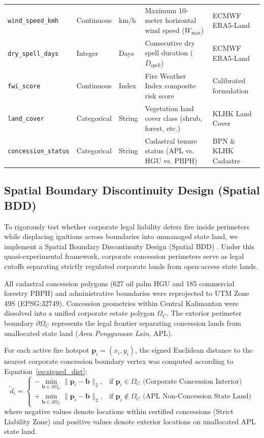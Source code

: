 \begin{table}[htbp]
\begin{tabularx}{\textwidth}{lllLP{3.0cm}}
\texttt{wind\_speed\_kmh} & Continuous & km/h & Maximum 10-meter horizontal wind speed ($W_{\text{max}}$) & ECMWF ERA5-Land \\
\texttt{dry\_spell\_days} & Integer & Days & Consecutive dry spell duration ($D_{\text{spell}}$) & ECMWF ERA5-Land \\
\texttt{fwi\_score} & Continuous & Index & Fire Weather Index composite risk score & Calibrated formulation \\
\texttt{land\_cover} & Categorical & String & Vegetation land cover class (shrub, forest, etc.) & KLHK Land Cover \\
\texttt{concession\_status} & Categorical & String & Cadastral tenure status (APL vs. HGU vs. PBPH) & BPN \& KLHK Cadastre \\
\bottomrule
\end{tabularx}
\end{table}

\subsection{Spatial Boundary Discontinuity Design (Spatial BDD)}
\label{subsec:spatial_bdd_methods}

To rigorously test whether corporate legal liability deters fire inside perimeters while displacing ignitions across boundaries into unmanaged state land, we implement a Spatial Boundary Discontinuity Design (Spatial BDD) \citep{LeeLemieux2010JEL}. Under this quasi-experimental framework, corporate concession perimeters serve as legal cutoffs separating strictly regulated corporate lands from open-access state lands.

All cadastral concession polygons (627 oil palm HGU and 185 commercial forestry PBPH) and administrative boundaries were reprojected to UTM Zone 49S (\mbox{EPSG:32749}). Concession geometries within Central Kalimantan were dissolved into a unified corporate estate polygon $\Omega_C$. The exterior perimeter boundary $\partial \Omega_C$ represents the legal frontier separating concession lands from unallocated state land (\textit{Area Penggunaan Lain}, APL).

For each active fire hotspot $\mathbf{p}_i = (x_i, y_i)$, the signed Euclidean distance to the nearest corporate concession boundary vertex was computed according to Equation~\eqref{eq:signed_dist}:
\begin{equation}
\tilde{d}_i = \begin{cases}
-\min_{\mathbf{b} \in \partial \Omega_C} \|\mathbf{p}_i - \mathbf{b}\|_2, & \text{if } \mathbf{p}_i \in \Omega_C \text{ (Corporate Concession Interior)} \\
+\min_{\mathbf{b} \in \partial \Omega_C} \|\mathbf{p}_i - \mathbf{b}\|_2, & \text{if } \mathbf{p}_i \notin \Omega_C \text{ (APL Non-Concession State Land)}
\end{cases}
\label{eq:signed_dist}
\end{equation}
where negative values denote locations within certified concessions (Strict Liability Zone) and positive values denote exterior locations on unallocated APL state land.

